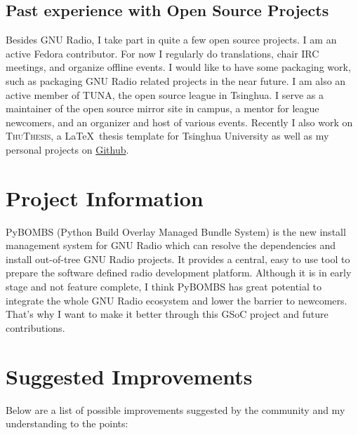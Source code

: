 \documentclass[a4paper]{article}
\begin{document}
\subsection{Past experience with Open Source Projects}

Besides GNU Radio, I take part in quite a few open source projects.  I
am an active Fedora contributor. For now I regularly do translations,
chair IRC meetings, and organize offline events.  I would like to have
some packaging work, such as packaging GNU Radio related projects in the
near future. I am also an active member of TUNA, the open source league
in Tsinghua. I serve as a maintainer of the open source mirror site in
campus, a mentor for league newcomers, and an organizer and host of various
events. Recently I also work on \textsc{ThuThesis}, a \LaTeX\ thesis template
for Tsinghua University as well as my personal projects on
\href{https://github.com/alick9188}{Github}.

\section{Project Information}

PyBOMBS (Python Build Overlay Managed Bundle System) is the new install
management system for GNU Radio which can resolve the dependencies and
install out-of-tree GNU Radio projects. It provides a central, easy to
use tool to prepare the software defined radio development platform.
Although it is in early stage and not feature
complete, I think PyBOMBS has great potential to integrate the whole GNU
Radio ecosystem and lower the barrier to newcomers. That's why I want to
make it better through this GSoC project and future contributions.

\section{Suggested Improvements}

Below are a list of possible improvements suggested by the community
and my understanding to the points:
\end{document}

